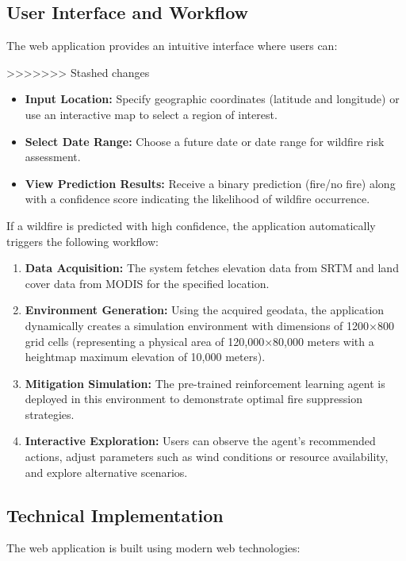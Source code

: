 \documentclass[conference]{IEEEtran}
\begin{document}
\subsection{User Interface and Workflow}
The web application provides an intuitive interface where users can:

>>>>>>> Stashed changes
\begin{itemize}
    \item \textbf{Input Location:} Specify geographic coordinates (latitude and longitude) or use an interactive map to select a region of interest.
    
    \item \textbf{Select Date Range:} Choose a future date or date range for wildfire risk assessment.
    
    \item \textbf{View Prediction Results:} Receive a binary prediction (fire/no fire) along with a confidence score indicating the likelihood of wildfire occurrence.
\end{itemize}

\noindent
If a wildfire is predicted with high confidence, the application automatically triggers the following workflow:

\begin{enumerate}
    \item \textbf{Data Acquisition:} The system fetches elevation data from SRTM and land cover data from MODIS for the specified location.
    
    \item \textbf{Environment Generation:} Using the acquired geodata, the application dynamically creates a simulation environment with dimensions of 1200×800 grid cells (representing a physical area of 120,000×80,000 meters with a heightmap maximum elevation of 10,000 meters).
    
    \item \textbf{Mitigation Simulation:} The pre-trained reinforcement learning agent is deployed in this environment to demonstrate optimal fire suppression strategies.
    
    \item \textbf{Interactive Exploration:} Users can observe the agent's recommended actions, adjust parameters such as wind conditions or resource availability, and explore alternative scenarios.
\end{enumerate}

\subsection{Technical Implementation}
The web application is built using modern web technologies:
\end{document}

